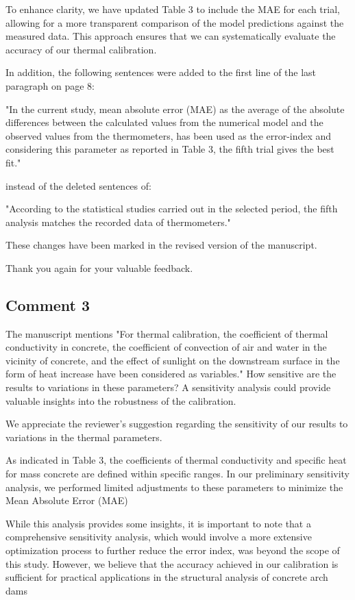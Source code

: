 \documentclass{ar2rc}
\begin{document}
	To enhance clarity, we have updated Table 3 to include the MAE for each trial, allowing for a more transparent comparison of the model predictions against the measured data. This approach ensures that we can systematically evaluate the accuracy of our thermal calibration.
	
	In addition, the following sentences were added to the first line of the last paragraph on page 8:
	
	"In the current study, mean absolute error (MAE) as the average of the absolute differences between the calculated values from the numerical model and the observed values from the thermometers, has been used as the error-index and considering this parameter as reported in Table 3, the fifth trial gives the best fit."
	
	instead of the deleted sentences of:
	
	"According to the statistical studies carried out in the selected period, the fifth analysis matches the recorded data of thermometers."
	
	These changes have been marked in the revised version of the manuscript.
	
	Thank you again for your valuable feedback.
	
	\subsection{Comment 3}
	\RC The manuscript mentions "For thermal calibration, the coefficient of thermal conductivity in concrete, the coefficient of convection of air and water in the vicinity of concrete, and the effect of sunlight on the downstream surface in the form of heat increase have been considered as variables." How sensitive are the results to variations in these parameters? A
	sensitivity analysis could provide valuable insights into the robustness of the calibration.
	
	\AR We appreciate the reviewer’s suggestion regarding the sensitivity of our results to variations in the thermal parameters.
	
	As indicated in Table 3, the coefficients of thermal conductivity and specific heat for mass concrete are defined within specific ranges. In our preliminary sensitivity analysis, we performed limited adjustments to these parameters to minimize the Mean Absolute Error (MAE)
	
	While this analysis provides some insights, it is important to note that a comprehensive sensitivity analysis, which would involve a more extensive optimization process to further reduce the error index, was beyond the scope of this study. However, we believe that the accuracy achieved in our calibration is sufficient for practical applications in the structural analysis of concrete arch dams
\end{document}
